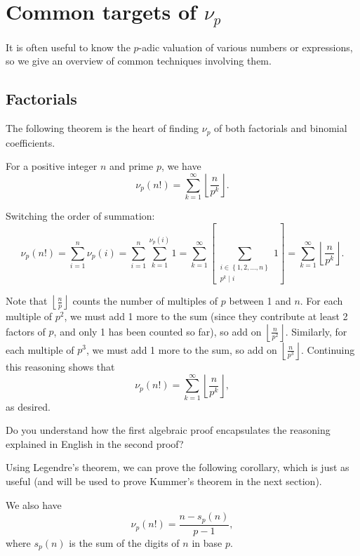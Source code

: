 \documentclass[blue,onecol]{shooting}
\begin{document}
\section{Common targets of $\nu_p$}
It is often useful to know the $p$-adic valuation of various numbers or expressions, so we give an overview of common techniques involving them.
\subsection{Factorials}
The following theorem is the heart of finding $\nu_p$ of both factorials and binomial coefficients.
\begin{theo}[Legendre]
    For a positive integer $n$ and prime $p$, we have \[\nu_p(n!)=\sum_{k=1}^{\infty}\left\lfloor \frac n{p^k} \right\rfloor.\]
\end{theo}

\begin{pro}[1]
    Switching the order of summation: \[\nu_p(n!)=\sum_{i=1}^n \nu_p(i)=\sum_{i=1}^n\sum_{k=1}^{\nu_p(i)}1=\sum_{k=1}^{\infty}\left[\sum_{\substack{i\in\left\{ 1,2,\dots,n \right\}\\ p^k\mid i}}1\right]=\sum_{k=1}^\infty\left\lfloor \frac n{p^k} \right\rfloor.\]
\end{pro}

\begin{pro}[2]
    Note that $\left\lfloor \frac np \right\rfloor$ counts the number of multiples of $p$ between 1 and $n$. For each multiple of $p^2$, we must add 1 more to the sum (since they contribute at least 2 factors of $p$, and only 1 has been counted so far), so add on $\left\lfloor \frac n{p^2} \right\rfloor$. Similarly, for each multiple of $p^3$, we must add 1 more to the sum, so add on $\left\lfloor \frac n{p^3} \right\rfloor$. Continuing this reasoning shows that \[\nu_p(n!)=\sum_{k=1}^{\infty}\left\lfloor \frac n{p^k} \right\rfloor,\] as desired.
\end{pro}

\begin{remark}
    Do you understand how the first algebraic proof encapsulates the reasoning explained in English in the second proof?
\end{remark}

Using Legendre's theorem, we can prove the following corollary, which is just as useful (and will be used to prove Kummer's theorem in the next section).

\begin{corollary}
    We also have \[\nu_p(n!)=\frac{n-s_p(n)}{p-1},\] where $s_p(n)$ is the sum of the digits of $n$ in base $p$.
\end{corollary}
\end{document}

